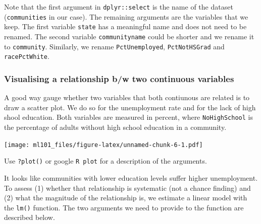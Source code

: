 \documentclass[]{article}
\newenvironment{Shaded}{\begin{snugshade}}{\end{snugshade}}
\newcommand{\DataTypeTok}[1]{\textcolor[rgb]{0.13,0.29,0.53}{#1}}
\newcommand{\DecValTok}[1]{\textcolor[rgb]{0.00,0.00,0.81}{#1}}
\newcommand{\KeywordTok}[1]{\textcolor[rgb]{0.13,0.29,0.53}{\textbf{#1}}}
\newcommand{\NormalTok}[1]{#1}
\newcommand{\OperatorTok}[1]{\textcolor[rgb]{0.81,0.36,0.00}{\textbf{#1}}}
\newcommand{\StringTok}[1]{\textcolor[rgb]{0.31,0.60,0.02}{#1}}
\begin{document}
Note that the first argument in \texttt{dplyr::select} is the name of the dataset (\texttt{communities} in our case). The remaining arguments are the variables that we keep. The first variable \texttt{state} has a meaningful name and does not need to be renamed. The second variable \texttt{communityname} could be shorter and we rename it to \texttt{community}. Similarly, we rename \texttt{PctUnemployed}, \texttt{PctNotHSGrad} and \texttt{racePctWhite}.

\hypertarget{visualising-a-relationship-bw-two-continuous-variables}{%
\subsubsection{Visualising a relationship b/w two continuous variables}\label{visualising-a-relationship-bw-two-continuous-variables}}

A good way gauge whether two variables that both contiunous are related is to draw a scatter plot. We do so for the unemployment rate and for the lack of high shool education. Both variables are measured in percent, where \texttt{NoHighSchool} is the percentage of adults without high school education in a community.

\begin{Shaded}
\end{Shaded}

\texttt{[image: ml101\_files/figure-latex/unnamed-chunk-6-1.pdf]}

Use \texttt{?plot()} or google \texttt{R\ plot} for a description of the arguments.

It looks like communities with lower education levels suffer higher unemployment. To assess (1) whether that relationship is systematic (not a chance finding) and (2) what the magnitude of the relationship is, we estimate a linear model with the \texttt{lm()} function. The two arguments we need to provide to the function are described below.
\end{document}
